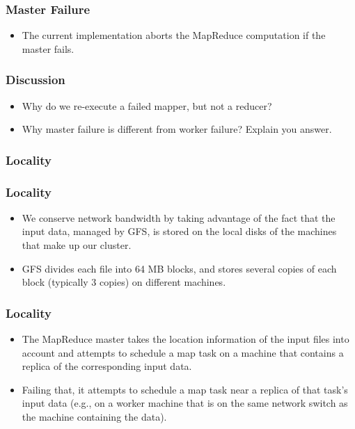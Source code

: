 \documentclass{beamer}
\begin{document}
\begin{frame}
  \frametitle{Master Failure}
  \begin{itemize}
    \item The current implementation aborts the MapReduce computation
      if the master fails.
  \end{itemize}
\end{frame}

\begin{frame}
  \frametitle{Discussion}
  \begin{itemize}
    \item Why do we re-execute a failed mapper, but not a reducer?
    \item Why master failure is different from worker failure? Explain
      you answer.
  \end{itemize}
\end{frame}

\subsubsection{Locality}

\begin{frame}
  \frametitle{Locality}
  \begin{itemize}
    \item We conserve network bandwidth by taking advantage of the
      fact that the input data, managed by GFS, is stored on the local
      disks of the machines that make up our cluster.
    \item GFS divides each file into 64 MB blocks, and stores several
      copies of each block (typically 3 copies) on different
      machines. 
  \end{itemize}
\end{frame}

\begin{frame}
  \frametitle{Locality}
  \begin{itemize}
    \item The MapReduce master takes the location information of the
      input files into account and attempts to schedule a map task on
      a machine that contains a replica of the corresponding input
      data.
    \item Failing that, it attempts to schedule a map task near a
      replica of that task’s input data (e.g., on a worker machine
      that is on the same network switch as the machine containing the
      data).
  \end{itemize}
\end{frame}
\end{document}
